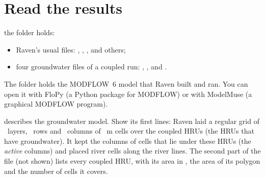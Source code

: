\section{Read the results}

\why the folder holds:
\begin{itemize}
\item Raven's usual files: , , , 
  and others;
\item four groundwater files of a coupled run: , ,  and
  .
\end{itemize} The folder  holds the MODFLOW~6 model that Raven built
and ran. You can open it with FloPy (a Python package for MODFLOW) or with ModelMuse (a graphical MODFLOW program).

 describes the groundwater model. Show its first lines:
\why Raven laid a regular grid of ~layers, ~rows and ~columns of ~m cells
over the  coupled HRUs (the HRUs that have groundwater). It kept the  columns of cells that lie
under these HRUs (the \emph{active} columns) and placed  river cells along the river lines. The second part
of the file (not shown) lists every coupled HRU, with its area in , the area of its polygon and the number
of cells it covers.

